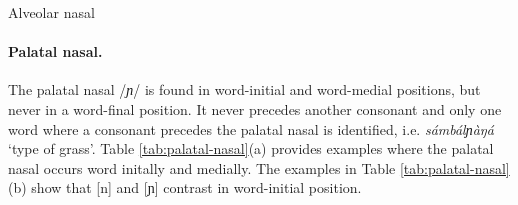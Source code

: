\begin{table}[htb] \small
\centering
\caption{Alveolar nasal\label{tab:alveolar-nasal}}
\quad
{}

\end{table}

\paragraph{Palatal nasal.}

The palatal nasal /{\it ɲ}/ is found in word-initial  and word-medial 
positions, but never in  a word-final position. It never precedes another 
consonant and only one word where a consonant precedes the palatal nasal is 
identified, i.e. {\it sámbálɲàŋá} `type of grass'.  Table  
\ref{tab:palatal-nasal}(a) provides examples where the palatal nasal occurs word 
initally and medially. The examples in Table \ref{tab:palatal-nasal}(b)  show 
that [n] and [ɲ] contrast in word-initial position.  



